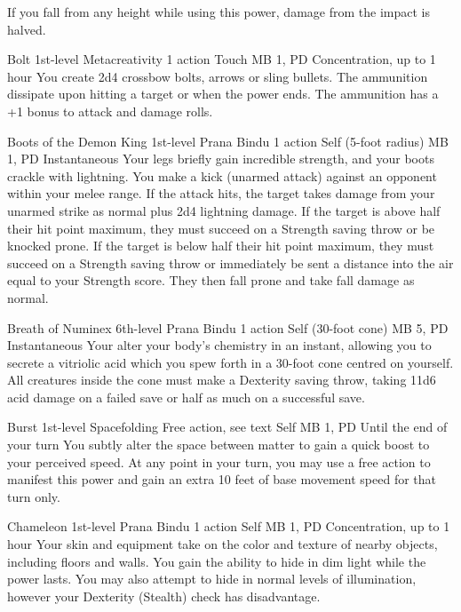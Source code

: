 If you fall from any height while using this power,
damage from the impact is halved.

\DndPowerHeader%
  {Bolt}
  {1st-level Metacreativity}
  {1 action}
  {Touch}
  {MB 1, PD \lvlone}
  {Concentration, up to 1 hour}
You create 2d4 crossbow bolts, arrows or sling bullets.
The ammunition dissipate upon hitting a target
or when the power ends.
The ammunition has a +1 bonus to attack and damage rolls.

\DndPowerHeader%
  {Boots of the Demon King}
  {1st-level Prana Bindu}
  {1 action}
  {Self (5-foot radius)}
  {MB 1, PD \lvlone}
  {Instantaneous}
Your legs briefly gain incredible strength,
and your boots crackle with lightning.
You make a kick (unarmed attack) against an
opponent within your melee range.
If the attack hits,
the target takes damage from your unarmed strike
as normal plus 2d4 lightning damage.
If the target is above half their hit point maximum,
they must succeed on a Strength saving throw or be knocked prone.
If the target is below half their hit point maximum,
they must succeed on a Strength saving throw or immediately
be sent a distance into the air equal to your Strength score.
They then fall prone and take fall damage as normal.

\DndPowerHeader%
  {Breath of Numinex}
  {6th-level Prana Bindu}
  {1 action}
  {Self (30-foot cone)}
  {MB 5, PD \lvlsix}
  {Instantaneous}
Your alter your body's chemistry in an instant,
allowing you to secrete a vitriolic acid
which you spew forth in a 30-foot cone
centred on yourself.
All creatures inside the cone must make a
Dexterity saving throw,
taking 11d6 acid damage on a failed save
or half as much on a successful save. 

\DndPowerHeader%
  {Burst}
  {1st-level Spacefolding}
  {Free action, see text}
  {Self}
  {MB 1, PD \lvlone}
  {Until the end of your turn}
You subtly alter the space between matter
to gain a quick boost to your perceived speed.
At any point in your turn,
you may use a free action to manifest this power
and gain an extra 10 feet of base movement speed
for that turn only.

\DndPowerHeader%
  {Chameleon}
  {1st-level Prana Bindu}
  {1 action}
  {Self}
  {MB 1, PD \lvlone}
  {Concentration, up to 1 hour}
Your skin and equipment take on the color and texture
of nearby objects,
including floors and walls.
You gain the ability to hide in dim light
while the power lasts.
You may also attempt to hide in normal levels
of illumination,
however your Dexterity (Stealth) check has disadvantage.

